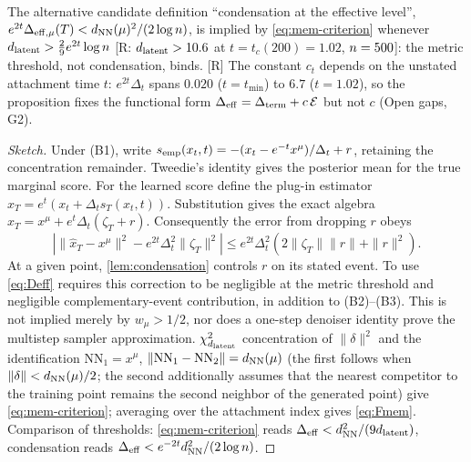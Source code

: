 \begin{proposition}
\begin{equation}
\begin{aligned}
\end{aligned}
\end{equation}
The alternative candidate definition ``condensation at the effective level'', $e^{2t}\Delta_{\rm eff,\mu}(T)<d_{\rm NN}(\mu)^2/(2\log n)$, is implied by \eqref{eq:mem-criterion} whenever $d_{\mathrm{latent}}>\tfrac29e^{2t}\log n$ [R: $d_{\mathrm{latent}}>10.6$ at $t=t_c(200)=1.02$, $n=500$]: the metric threshold, not condensation, binds. [R] The constant $c_t$ depends on the unstated attachment time $t$: $e^{2t}\Delta_t$ spans $0.020$ ($t=t_{\min}$) to $6.7$ ($t=1.02$), so the proposition fixes the functional form $\Delta_{\rm eff}=\Delta_{\rm term}+c\,\mathcal E$ but not $c$ (Open gaps, G2).
\end{proposition}
\begin{proof}[Sketch]
Under (B1), write $s_{\rm emp}(x_t,t)=-(x_t-e^{-t}x^\mu)/\Delta_t+r$, retaining the concentration remainder. Tweedie's identity \citep{efron2011tweedie} gives the posterior mean for the true marginal score. For the learned score define the plug-in estimator $\hat x_T=e^t(x_t+\Delta_t s_T(x_t,t))$. Substitution gives the exact algebra $\hat x_T=x^\mu+e^t\Delta_t(\zeta_T+r)$. Consequently the error from dropping $r$ obeys
\[\left|\|\hat x_T-x^\mu\|^2-e^{2t}\Delta_t^2\|\zeta_T\|^2\right|\le e^{2t}\Delta_t^2(2\|\zeta_T\|\|r\|+\|r\|^2).\]
At a given point, \cref{lem:condensation} controls $r$ on its stated event. To use \eqref{eq:Deff} requires this correction to be negligible at the metric threshold and negligible complementary-event contribution, in addition to (B2)--(B3). This is not implied merely by $w_\mu>1/2$, nor does a one-step denoiser identity prove the multistep sampler approximation. $\chi^2_{d_{\mathrm{latent}}}$ concentration of $\|\delta\|^2$ and the identification $\mathrm{NN}_1=x^\mu$, $\|\mathrm{NN}_1-\mathrm{NN}_2\|=d_{\rm NN}(\mu)$ (the first follows when $\|\delta\|<d_{\rm NN}(\mu)/2$; the second additionally assumes that the nearest competitor to the training point remains the second neighbor of the generated point) give \eqref{eq:mem-criterion}; averaging over the attachment index gives \eqref{eq:Fmem}. Comparison of thresholds: \eqref{eq:mem-criterion} reads $\Delta_{\rm eff}<d_{\rm NN}^2/(9d_{\mathrm{latent}})$, condensation reads $\Delta_{\rm eff}<e^{-2t}d_{\rm NN}^2/(2\log n)$.


\end{proof}
